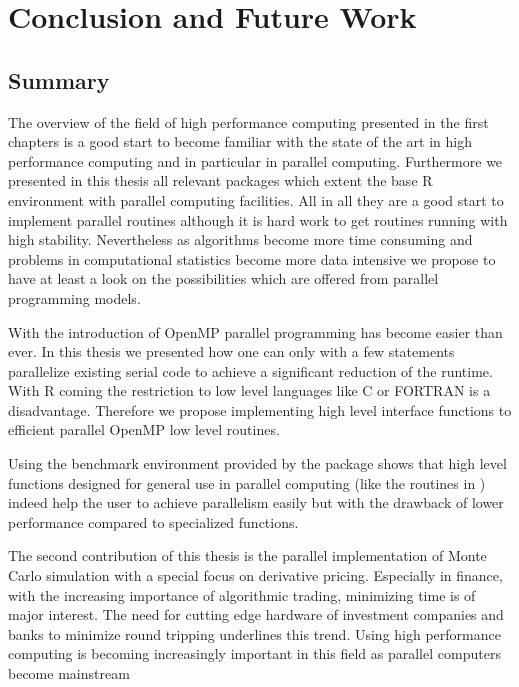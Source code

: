 \chapter{Conclusion and Future Work}
\label{chap:conclusion}
\section{Summary}

The overview of the field of high performance computing presented in
the first chapters is a good start to become familiar with the state
of the art in high performance computing and in particular in parallel
computing. Furthermore we presented in this thesis all relevant
packages which extent the base R environment with parallel computing
facilities. All in all they are a good start to implement parallel
routines although it is hard work to get routines running with high
stability. Nevertheless as algorithms become more time consuming and
problems in computational statistics become more data intensive we
propose to have at least a look on the possibilities which are offered
from parallel programming models.

With the introduction of OpenMP parallel programming has become easier
than ever. In this thesis we presented how one can only with a few
statements parallelize existing serial code to achieve a significant
reduction of the runtime. With R coming the restriction to low level
languages like C or FORTRAN is a disadvantage. Therefore we propose
implementing high level interface functions to efficient parallel
OpenMP low level routines.

Using the benchmark environment provided by the package 
shows that high level functions designed for general use in parallel
computing (like the routines in )
indeed help the user to achieve parallelism easily but with the
drawback of lower performance compared to
specialized functions. 

The second contribution of this thesis is the parallel implementation
of Monte Carlo simulation with a special focus on derivative
pricing. Especially in finance, with the increasing importance of
algorithmic trading, minimizing time is of major interest. The need for
cutting edge hardware of investment companies and banks to minimize
round tripping underlines this trend. Using high performance computing
is becoming increasingly important in this field as parallel computers
become mainstream %


